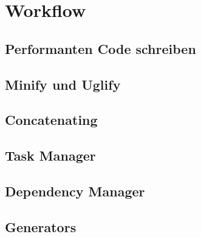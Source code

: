 \section{Workflow} %
\label{sec:workflow}

	\subsection{Performanten Code schreiben}
	\label{sub:performanten_code_schreiben}
	

	\subsection{Minify und Uglify}
	\label{sub:minify_und_uglify}
	

	\subsection{Concatenating}
	\label{sub:concatenating}
	

	\subsection{Task Manager}
	\label{sub:task_manager}
	

	\subsection{Dependency Manager}
	\label{sub:dependency_manager}
	

	\subsection{Generators}
	\label{sub:generators}
	


